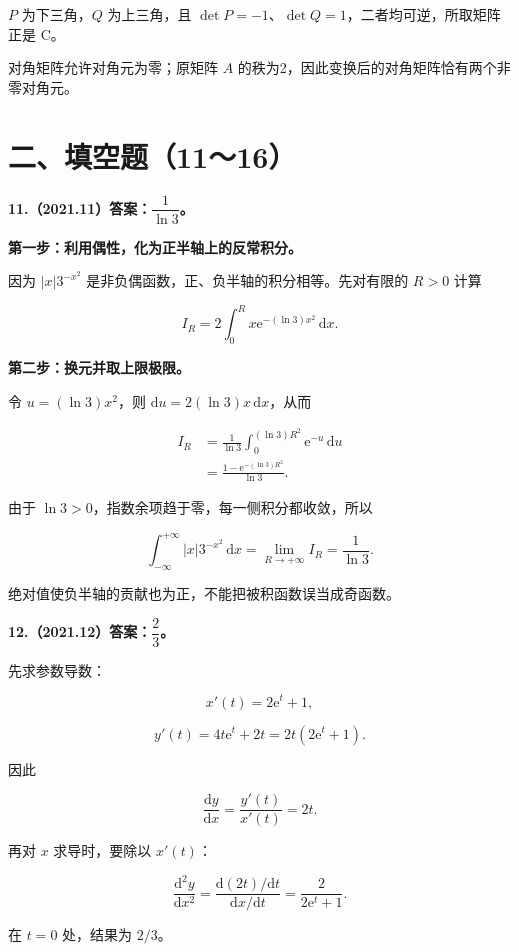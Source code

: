 \documentclass[UTF8,11pt,fontset=windows]{ctexart}
\begin{document}
$P$ 为下三角，$Q$ 为上三角，且 $\det P=-1$、$\det Q=1$，二者均可逆，所取矩阵正是 C。

对角矩阵允许对角元为零；原矩阵 $A$ 的秩为2，因此变换后的对角矩阵恰有两个非零对角元。

\clearpage

\section*{二、填空题（11～16）}

\textbf{11.（2021.11）答案：$\dfrac1{\ln3}$。}

\textbf{第一步：利用偶性，化为正半轴上的反常积分。}

因为 $|x|3^{-x^2}$ 是非负偶函数，正、负半轴的积分相等。先对有限的 $R>0$ 计算

$$
I_R=2\int_0^R x\mathrm e^{-(\ln3)x^2}\,\mathrm dx.
$$

\textbf{第二步：换元并取上限极限。}

令 $u=(\ln3)x^2$，则 $\mathrm du=2(\ln3)x\,\mathrm dx$，从而

$$
\begin{aligned}
I_R&=\frac1{\ln3}\int_0^{(\ln3)R^2}\mathrm e^{-u}\,\mathrm du\\
&=\frac{1-\mathrm e^{-(\ln3)R^2}}{\ln3}.
\end{aligned}
$$

由于 $\ln3>0$，指数余项趋于零，每一侧积分都收敛，所以

$$
\boxed{\int_{-\infty}^{+\infty}|x|3^{-x^2}\,\mathrm dx
=\lim_{R\to+\infty}I_R=\frac1{\ln3}}.
$$

绝对值使负半轴的贡献也为正，不能把被积函数误当成奇函数。

\clearpage

\textbf{12.（2021.12）答案：$\dfrac23$。}

先求参数导数：

$$
x'(t)=2\mathrm e^t+1,
$$

$$
y'(t)=4t\mathrm e^t+2t=2t(2\mathrm e^t+1).
$$

因此

$$
\frac{\mathrm dy}{\mathrm dx}=
\frac{y'(t)}{x'(t)}=2t.
$$

再对 $x$ 求导时，要除以 $x'(t)$：

$$
\frac{\mathrm d^2y}{\mathrm dx^2}
=\frac{\mathrm d(2t)/\mathrm dt}{\mathrm dx/\mathrm dt}
=\frac2{2\mathrm e^t+1}.
$$

在 $t=0$ 处，结果为 $2/3$。
\end{document}
